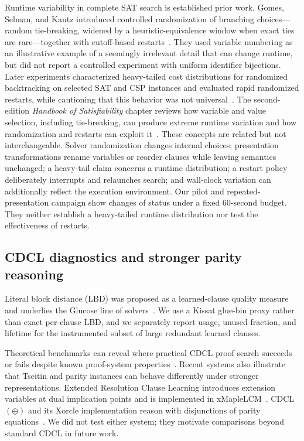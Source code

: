 \documentclass[11pt]{article}
\begin{document}
Runtime variability in complete SAT search is established prior work. Gomes, Selman, and Kautz introduced controlled randomization of branching choices---random tie-breaking, widened by a heuristic-equivalence window when exact ties are rare---together with cutoff-based restarts~\cite{GomesEtAl1998}. They used variable numbering as an illustrative example of a seemingly irrelevant detail that can change runtime, but did not report a controlled experiment with uniform identifier bijections. Later experiments characterized heavy-tailed cost distributions for randomized backtracking on selected SAT and CSP instances and evaluated rapid randomized restarts, while cautioning that this behavior was not universal~\cite{GomesEtAl2000}. The second-edition \emph{Handbook of Satisfiability} chapter reviews how variable and value selection, including tie-breaking, can produce extreme runtime variation and how randomization and restarts can exploit it~\cite{GomesSabharwal2021}. These concepts are related but not interchangeable. Solver randomization changes internal choices; presentation transformations rename variables or reorder clauses while leaving semantics unchanged; a heavy-tail claim concerns a runtime distribution; a restart policy deliberately interrupts and relaunches search; and wall-clock variation can additionally reflect the execution environment. Our pilot and repeated-presentation campaign show changes of status under a fixed 60-second budget. They neither establish a heavy-tailed runtime distribution nor test the effectiveness of restarts.

\subsection{CDCL diagnostics and stronger parity reasoning}

Literal block distance (LBD) was proposed as a learned-clause quality measure and underlies the Glucose line of solvers~\cite{AudemardSimon2009}. We use a Kissat glue-bin proxy rather than exact per-clause LBD, and we separately report usage, unused fraction, and lifetime for the instrumented subset of large redundant learned clauses.

Theoretical benchmarks can reveal where practical CDCL proof search succeeds or fails despite known proof-system properties~\cite{ElffersEtAl2018}. Recent systems also illustrate that Tseitin and parity instances can behave differently under stronger representations. Extended Resolution Clause Learning introduces extension variables at dual implication points and is implemented in xMapleLCM~\cite{BussEtAl2026}. CDCL$(\oplus)$ and its Xorcle implementation reason with disjunctions of parity equations~\cite{BeameSun2026}. We did not test either system; they motivate comparisons beyond standard CDCL in future work.
\end{document}
